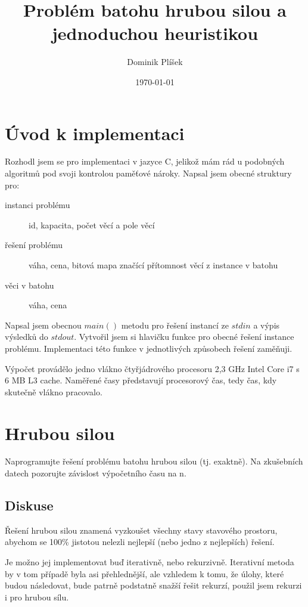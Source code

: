 \documentclass[12pt,a4paper]{article}
\begin{document}
\title{Problém batohu hrubou silou a jednoduchou heuristikou}
\author{Dominik Plíšek}
\date{\dmyyyydate\today}
\maketitle

\section*{Úvod k implementaci}

Rozhodl jsem se pro implementaci v jazyce C, jelikož mám rád u podobných algoritmů pod svoji kontrolou paměťové nároky. 
Napsal jsem obecné struktury pro:

\begin{description}
\item[instanci problému] id, kapacita, počet věcí a pole věcí
\item[řešení problému] váha, cena, bitová mapa značící přítomnost věcí z instance v batohu
\item[věci v batohu] váha, cena
\end{description}

Napsal jsem obecnou $main()$ metodu
pro řešení instancí ze $stdin$ a výpis výsledků do $stdout$. Vytvořil jsem si hlavičku funkce pro obecné řešení instance
problému. Implementaci této funkce v jednotlivých způsobech řešení zaměňuji.

Výpočet provádělo jedno vlákno čtyřjádrového procesoru 2,3 GHz Intel Core i7 s 6 MB L3 cache.
Naměřené časy představují procesorový čas, tedy čas, kdy skutečně vlákno pracovalo.


\section{Hrubou silou}

Naprogramujte řešení problému batohu hrubou silou (tj. exaktně). Na zkušebních datech pozorujte závislost výpočetního času na n.

\subsection{Diskuse}

Řešení hrubou silou znamená vyzkoušet všechny stavy stavového prostoru, abychom se 100\% jistotou nelezli nejlepší (nebo jedno
z nejlepších) řešení.

Je možno jej implementovat buď iterativně, nebo rekurzivně. Iterativní metoda by v tom případě byla asi přehlednější,
ale vzhledem k tomu, že úlohy, které budou následovat, bude patrně podstatně snažší řešit rekurzí, 
použil jsem rekurzi i pro hrubou sílu.
\end{document}
